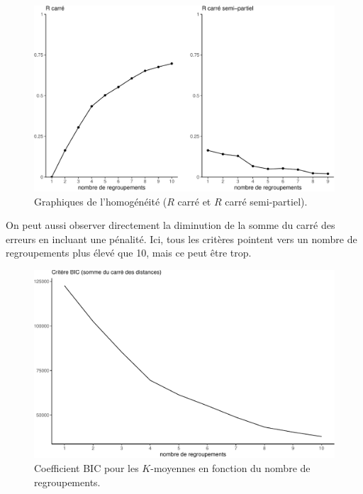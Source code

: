\documentclass[
  11pt,
  letterpaper,
]{scrbook}
\theoremstyle{definition}
\theoremstyle{remark}
\begin{document}
\begin{figure}[ht!]

{\centering \includegraphics[width=1\textwidth,height=\textheight]{./03-regroupements_files/figure-pdf/fig-homogeneite-1.pdf}

}

\caption{\label{fig-homogeneite}Graphiques de l'homogénéité (\(R\) carré
et \(R\) carré semi-partiel).}

\end{figure}

On peut aussi observer directement la diminution de la somme du carré
des erreurs en incluant une pénalité. Ici, tous les critères pointent
vers un nombre de regroupements plus élevé que 10, mais ce peut être
trop.

\begin{figure}[ht!]

{\centering \includegraphics[width=1\textwidth,height=\textheight]{./03-regroupements_files/figure-pdf/fig-bickmoy-1.pdf}

}

\caption{\label{fig-bickmoy}Coefficient BIC pour les \(K\)-moyennes en
fonction du nombre de regroupements.}

\end{figure}
\end{document}
